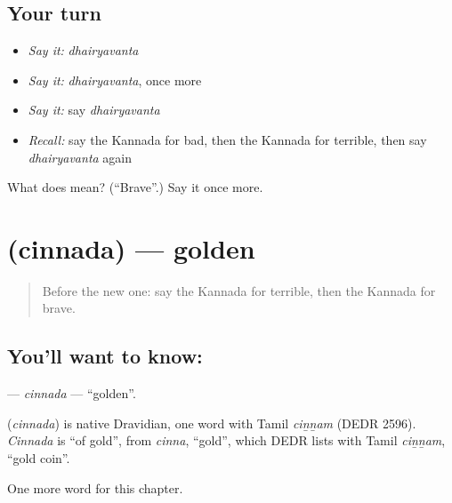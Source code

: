 \subsection*{Your turn}
\begin{itemize}
\raggedright
  \item \emph{Say it:} \emph{dhairyavanta}
  \item \emph{Say it:} \emph{dhairyavanta}, once more
  \item \emph{Say it:} say \emph{dhairyavanta}
  \item \emph{Recall:} say the Kannada for bad, then the Kannada for terrible, then say \emph{dhairyavanta} again
\end{itemize}

\begin{tcolorbox}[breakable,colback=teal!4,colframe=teal!35!black,title={Before you move on}]
What does  mean? (\textquotedblleft{}Brave\textquotedblright{}.) Say it once more.
\end{tcolorbox}
\section[\texorpdfstring{\kn{ಚಿನ್ನದ} (cinnada)}{ಚಿನ್ನದ (cinnada)}]{ (cinnada) — golden}

\label{lesson:KA-C146-cinnada}



\begin{quote}
Before the new one: say the Kannada for terrible, then the Kannada for brave.
\end{quote}

\subsection*{You'll want to know: }
\textbf{} — \emph{cinnada} — \textquotedblleft{}golden\textquotedblright{}.

\begin{cousinweb}
\textbf{} (\emph{cinnada}) is native Dravidian, one word with Tamil \emph{ciṉṉam} (DEDR 2596). \emph{Cinnada} is \textquotedblleft{}of gold\textquotedblright{}, from \emph{cinna}, \textquotedblleft{}gold\textquotedblright{}, which DEDR lists with Tamil \emph{ciṉṉam}, \textquotedblleft{}gold coin\textquotedblright{}.
\end{cousinweb}

\begin{grammarlens}[title={What you've built}]
One more word for this chapter.
\end{grammarlens}

